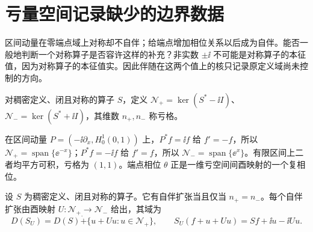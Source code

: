 \section{亏量空间记录缺少的边界数据}

区间动量在零端点域上对称却不自伴；给端点增加相位关系以后成为自伴。能否一般地判断一个对称算子是否容许这样的补充？非实数 \(\pm\ii\) 不可能是对称算子的本征值，因为对称算子的本征值实。因此伴随在这两个值上的核只记录原定义域尚未控制的方向。

\begin{definition}[亏量空间]
对稠密定义、闭且对称的算子 \(S\)，定义 \(\mathcal N_+=\ker(S^*-\ii I)\)、\(\mathcal N_-=\ker(S^*+\ii I)\)，其维数 \(n_+,n_-\) 称亏格。
\end{definition}

在区间动量 \(P=(-\ii\partial_x,H_0^1(0,1))\) 上，\(P^*f=\ii f\) 给 \(f'=-f\)，所以 \(\mathcal N_+=\operatorname{span}\{\ee^{-x}\}\)；\(P^*f=-\ii f\) 给 \(f'=f\)，所以 \(\mathcal N_-=\operatorname{span}\{\ee^x\}\)。有限区间上二者均平方可积，亏格为 \((1,1)\)。端点相位 \(\theta\) 正是一维亏空间间酉映射的一个复相位。

\begin{theorem}
设 \(S\) 为稠密定义、闭且对称的算子。它有自伴扩张当且仅当 \(n_+=n_-\)。每个自伴扩张由酉映射 \(U:\mathcal N_+\to\mathcal N_-\) 给出，其域为
\[
D(S_U)=D(S)\mathbin{\dot+}\{u+Uu:u\in\mathcal N_+\},
\qquad S_U(f+u+Uu)=Sf+\ii u-\ii Uu.
\]
\end{theorem}

